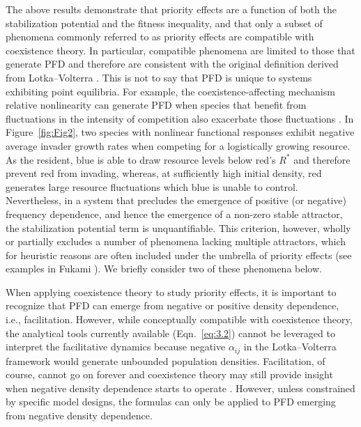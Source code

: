 The above results demonstrate that priority effects are a function of both the stabilization potential and the fitness inequality, and that only a subset of phenomena commonly referred to as priority effects are compatible with coexistence theory. In particular, compatible phenomena are limited to those that generate PFD and therefore are consistent with the original definition derived from Lotka--Volterra \citep{Petraitis2013}. This is not to say that PFD is unique to systems exhibiting point equilibria. For example, the coexistence-affecting mechanism relative nonlinearity can generate PFD when species that benefit from fluctuations in the intensity of competition also exacerbate those fluctuations \citep{Chesson2009}. In Figure~\ref{fig:Fig2}, two species with nonlinear functional responses exhibit negative average invader growth rates when competing for a logistically growing resource. As the resident, blue is able to draw resource levels below red's $R^*$ and therefore prevent red from invading, whereas, at sufficiently high initial density, red generates large resource fluctuations which blue is unable to control. Nevertheless, in a system that precludes the emergence of positive (or negative) frequency dependence, and hence the emergence of a non-zero stable attractor, the stabilization potential term is unquantifiable. This criterion, however, wholly or partially excludes a number of phenomena lacking multiple attractors, which for heuristic reasons are often included under the umbrella of priority effects (see examples in Fukami \cite{Fukami2015}). We briefly consider two of these phenomena below. 
\par


When applying coexistence theory to study priority effects, it is important to recognize that PFD can emerge from negative or positive density dependence, i.e., facilitation. However, while conceptually compatible with coexistence theory, the analytical tools currently available (Eqn.~\ref{eq:3.2}) cannot be leveraged to interpret the facilitative dynamics because negative $\alpha_{ij}$ in the Lotka--Volterra framework would generate unbounded population densities. Facilitation, of course, cannot go on forever and coexistence theory may still provide insight when negative density dependence starts to operate \citep{Schreiber2017}. However, unless constrained by specific model designs, the formulas can only be applied to PFD emerging from negative density dependence. 
\par


